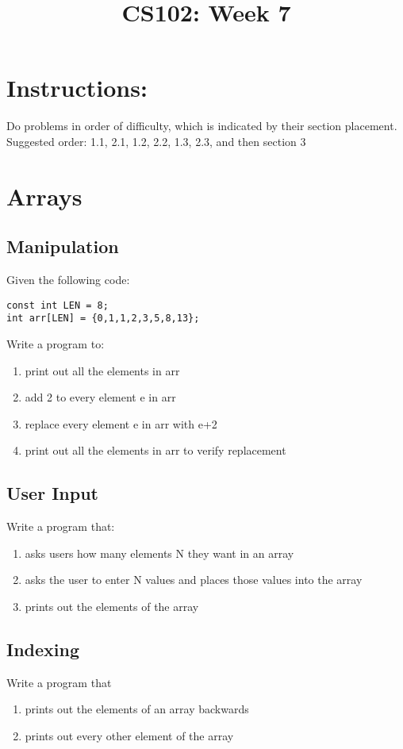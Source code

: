 \documentclass{article}
\begin{document}
\title{CS102: Week 7}

\maketitle
\section*{Instructions:}
Do problems in order of difficulty, which is indicated by their section placement. Suggested order: 1.1, 2.1, 1.2, 2.2, 1.3, 2.3, and then section 3

\section{Arrays}
\subsection{Manipulation}
Given the following code:
\begin{verbatim}
const int LEN = 8;
int arr[LEN] = {0,1,1,2,3,5,8,13};
\end{verbatim}
Write a program to:
\begin{enumerate}
	\item print out all the elements in arr
	\item add 2 to every element e in arr
	\item replace every element e in arr with e+2
	\item print out all the elements in arr to verify replacement
\end{enumerate}

\subsection{User Input}
Write a program that:
\begin{enumerate}
	\item asks users how many elements N they want in an array
	\item asks the user to enter N values and places those values into the array
	\item prints out the elements of the array
\end{enumerate}

\subsection{Indexing}
Write a program that
\begin{enumerate}
	\item prints out the elements of an array backwards
	\item prints out every other element of the array
\end{enumerate}
\end{document}
